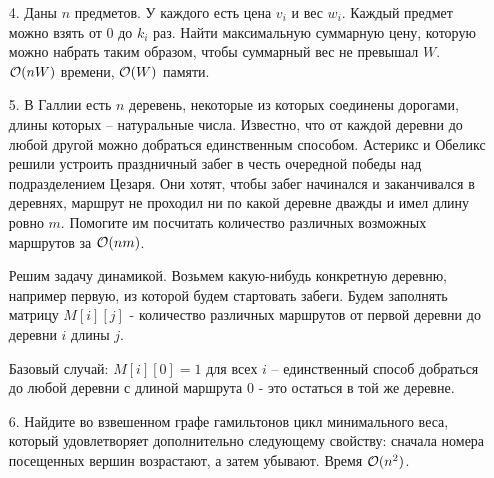 \begin{enumerate}
  \item[4.]
    Даны $n$ предметов. У каждого есть цена $v_i$ и вес $w_i$. Каждый предмет можно взять
    от $0$ до $k_i$ раз. Найти максимальную суммарную цену,
    которую можно набрать таким образом, чтобы суммарный вес не превышал $W$.
    $\mathcal{O}(nW)$ времени, $\mathcal{O}(W)$ памяти.

  \item[5.] 
    В Галлии есть $n$ деревень, некоторые из которых соединены дорогами, длины которых --
    натуральные числа. Известно, что от каждой деревни до любой другой можно добраться
    единственным способом. Астерикс и Обеликс решили устроить праздничный забег в честь
    очередной победы над подразделением Цезаря. Они хотят, чтобы забег начинался и заканчивался
    в деревнях, маршрут не проходил ни по какой деревне дважды и имел длину ровно $m$.
    Помогите им посчитать количество различных возможных маршрутов за $\mathcal{O}(nm)$.
    \begin{solution}
      Решим задачу динамикой. Возьмем какую-нибудь конкретную деревню, например первую, из которой будем стартовать забеги. Будем заполнять матрицу $M[i][j]$ - количество различных маршрутов от первой деревни до деревни $i$ длины $j$.

      Базовый случай: $M[i][0]=1$ для всех $i$ -- единственный способ добраться до любой деревни с длиной маршрута 0 - это остаться в той же деревне.
    \end{solution}

  \item[6.]
    Найдите во взвешенном графе гамильтонов цикл
    минимального веса, который удовлетворяет дополнительно следующему свойству: сначала
    номера посещенных вершин возрастают, а затем убывают. Время $\mathcal{O}(n^2)$.




\end{enumerate}

